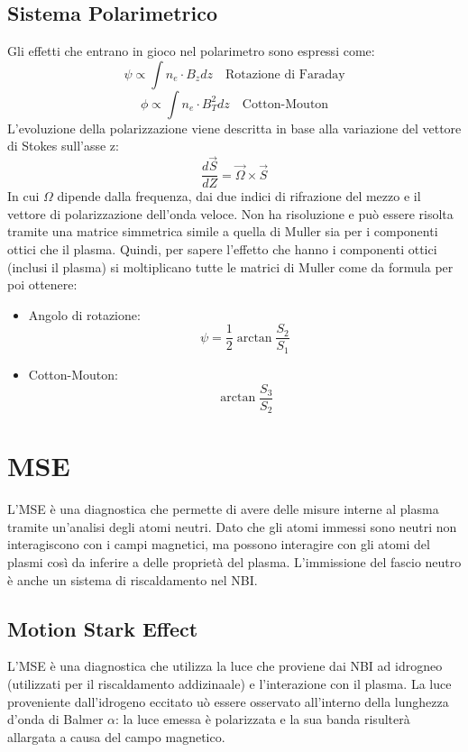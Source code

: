 \documentclass{article}
\begin{document}
\subsection{Sistema Polarimetrico}
Gli effetti che entrano in gioco nel polarimetro sono espressi come:
\begin{equation}
    \psi\propto \int n_{e}\cdot B_{z}dz\quad\text{Rotazione di Faraday}
\end{equation}
\begin{equation}
    \phi\propto \int n_{e}\cdot B_{T}^{2}dz\quad \text{Cotton-Mouton}
\end{equation}
L'evoluzione della polarizzazione viene descritta in base alla variazione del vettore di Stokes sull'asse z:
\begin{equation}
    \frac{d\overrightarrow{S}}{dZ}=\overrightarrow{\Omega}\times\overrightarrow{S}
\end{equation}
In cui \(\Omega \) dipende dalla frequenza, dai due indici di rifrazione del mezzo e il vettore di polarizzazione dell'onda veloce. Non ha risoluzione e può essere risolta tramite una matrice simmetrica simile a quella di Muller sia per i componenti ottici che il plasma.\newline
Quindi, per sapere l'effetto che hanno i componenti ottici (inclusi il plasma) si moltiplicano tutte le matrici di Muller come da formula per poi ottenere:
\begin{itemize}
    \item Angolo di rotazione:
    \begin{equation}
    \psi =\frac{1}{2}\arctan{\frac{S_{2}}{S_{1}}}
    \end{equation}
    \item Cotton-Mouton: \begin{equation}
        \arctan{\frac{S_{3}}{S_{2}}}
    \end{equation}
\end{itemize}
\section{MSE}
L'MSE è una diagnostica che permette di avere delle misure interne al plasma tramite un'analisi degli atomi neutri.\newline
Dato che gli atomi immessi sono neutri non interagiscono con i campi magnetici, ma possono interagire con gli atomi del plasmi così da inferire a delle proprietà del plasma. L'immissione del fascio neutro è anche un sistema di riscaldamento nel NBI.%
\subsection{Motion Stark Effect}
L'MSE è una diagnostica che utilizza la luce che proviene dai NBI ad idrogneo (utilizzati per il riscaldamento addizinaale) e l'interazione con il plasma. La luce proveniente dall'idrogeno eccitato uò essere osservato all'interno della lunghezza d'onda di Balmer \(\alpha \): la luce emessa è polarizzata e la sua banda risulterà allargata a causa del campo magnetico.
\end{document}
